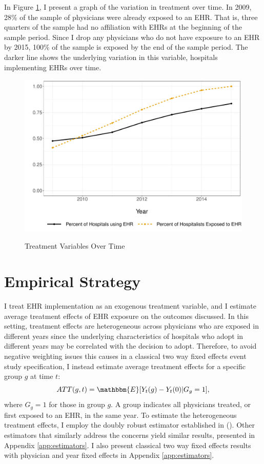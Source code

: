 \documentclass[12pt]{article}
\begin{document}
In Figure \ref{fig:treatmentgraph}, I present a graph of the variation in treatment over time. In 2009, 28\% of the sample of physicians were already exposed to an EHR. That is, three quarters of the sample had no affiliation with EHRs at the beginning of the sample period. Since I drop any physicians who do not have exposure to an EHR by 2015, 100\% of the sample is exposed by the end of the sample period. The darker line shows the underlying variation in this variable, hospitals implementing EHRs over time. 

\begin{figure}[t]
\centering
\captionsetup{width=.45\linewidth}
    \caption{Treatment Variables Over Time}
    \includegraphics[scale=.7]{Objects/sum_stats_year.pdf}
    \label{fig:treatmentgraph}
\end{figure}



\section{Empirical Strategy}\label{sec:empstrat}

I treat EHR implementation as an exogenous treatment variable, and I estimate average treatment effects of EHR exposure on the outcomes discussed. In this setting, treatment effects are heterogeneous across physicians who are exposed in different years since the underlying characteristics of hospitals who adopt in different years may be correlated with the decision to adopt. Therefore, to avoid negative weighting issues this causes in a classical two way fixed effects event study specification, I instead estimate average treatment effects for a specific group $g$ at time $t$: 
$$ATT(g,t)=\mathbbm{E}[Y_t(g)-Y_t(0)|G_g=1],$$
where $G_g=1$ for those in group $g$. A group indicates all physicians treated, or first exposed to an EHR, in the same year. To estimate the heterogeneous treatment effects, I employ the doubly robust estimator established in \citeauthor{sant2020doubly} (\citeyear{sant2020doubly}). Other estimators that similarly address the concerns yield similar results, presented in Appendix \ref{app:estimators}. I also present classical two way fixed effects results with physician and year fixed effects in Appendix \ref{app:estimators}.
\end{document}
